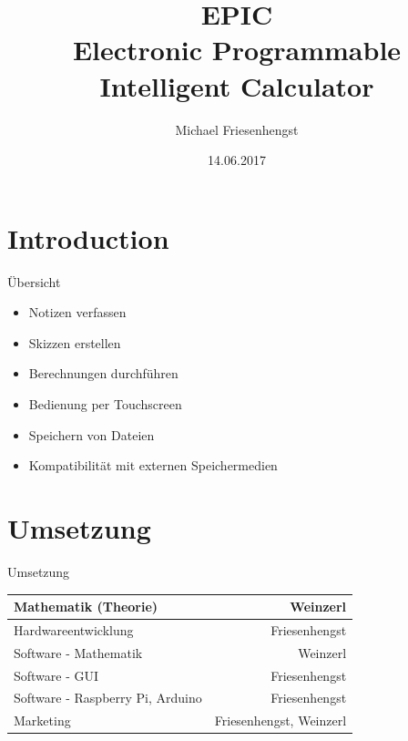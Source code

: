 \documentclass{beamer}
\title[Your Short Title]{EPIC
	\\
	{\large Electronic Programmable Intelligent Calculator}
}
\author{Michael Friesenhengst}
\institute{HTL Hollabrunn}
\date{14.06.2017}
\begin{document}
\begin{frame}
  \titlepage
\end{frame}


\section{Introduction}

\begin{frame}{Übersicht}


\begin{itemize}
  \item Notizen verfassen
  \item Skizzen erstellen
  \item Berechnungen durchführen
  \item Bedienung per Touchscreen
  \item Speichern von Dateien
  \item Kompatibilität mit externen Speichermedien
\end{itemize}



\end{frame}

\section{Umsetzung}

\begin{frame}{Umsetzung}



\begin{table}
	\centering
	\begin{tabular}{l|r}
		Mathematik (Theorie) & Weinzerl \\\hline
		\rowcolor{blue!25}
		Hardwareentwicklung & Friesenhengst \\\hline
		Software - Mathematik & Weinzerl \\\hline
		\rowcolor{blue!25}
		Software - GUI & Friesenhengst \\\hline
		\rowcolor{blue!25}
		Software - Raspberry Pi, Arduino & Friesenhengst \\\hline
		\rowcolor{blue!25}
		Marketing & Friesenhengst, Weinzerl
	\end{tabular}
\end{table}

\end{frame}
\end{document}
